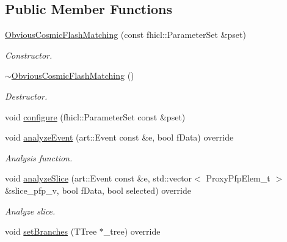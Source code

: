 \subsection*{Public Member Functions}
\begin{DoxyCompactItemize}
\item 
\hyperlink{classanalysis_1_1ObviousCosmicFlashMatching_a83be7e60be73f5d4297ae617b5f7c70f}{Obvious\+Cosmic\+Flash\+Matching} (const fhicl\+::\+Parameter\+Set \&pset)
\begin{DoxyCompactList}\small\item\em Constructor. \end{DoxyCompactList}\item 
\hyperlink{classanalysis_1_1ObviousCosmicFlashMatching_a130b94ad72bcc4157edc74e53d26d1c6}{$\sim$\+Obvious\+Cosmic\+Flash\+Matching} ()\hypertarget{classanalysis_1_1ObviousCosmicFlashMatching_a130b94ad72bcc4157edc74e53d26d1c6}{}\label{classanalysis_1_1ObviousCosmicFlashMatching_a130b94ad72bcc4157edc74e53d26d1c6}

\begin{DoxyCompactList}\small\item\em Destructor. \end{DoxyCompactList}\item 
void \hyperlink{classanalysis_1_1ObviousCosmicFlashMatching_a1ab342bc97749873a4e3118ab541af86}{configure} (fhicl\+::\+Parameter\+Set const \&pset)
\item 
void \hyperlink{classanalysis_1_1ObviousCosmicFlashMatching_ac2abf5075cbd03ffde102e14ae260707}{analyze\+Event} (art\+::\+Event const \&e, bool f\+Data) override
\begin{DoxyCompactList}\small\item\em Analysis function. \end{DoxyCompactList}\item 
void \hyperlink{classanalysis_1_1ObviousCosmicFlashMatching_adbdb066be56f971dc6dc4191a56b5693}{analyze\+Slice} (art\+::\+Event const \&e, std\+::vector$<$ Proxy\+Pfp\+Elem\+\_\+t $>$ \&slice\+\_\+pfp\+\_\+v, bool f\+Data, bool selected) override\hypertarget{classanalysis_1_1ObviousCosmicFlashMatching_adbdb066be56f971dc6dc4191a56b5693}{}\label{classanalysis_1_1ObviousCosmicFlashMatching_adbdb066be56f971dc6dc4191a56b5693}

\begin{DoxyCompactList}\small\item\em Analyze slice. \end{DoxyCompactList}\item 
void \hyperlink{classanalysis_1_1ObviousCosmicFlashMatching_ae3cb2192a7edde6b72b18f172f012c12}{set\+Branches} (T\+Tree $\ast$\+\_\+tree) override\hypertarget{classanalysis_1_1ObviousCosmicFlashMatching_ae3cb2192a7edde6b72b18f172f012c12}{}\label{classanalysis_1_1ObviousCosmicFlashMatching_ae3cb2192a7edde6b72b18f172f012c12}


\end{DoxyCompactItemize}
